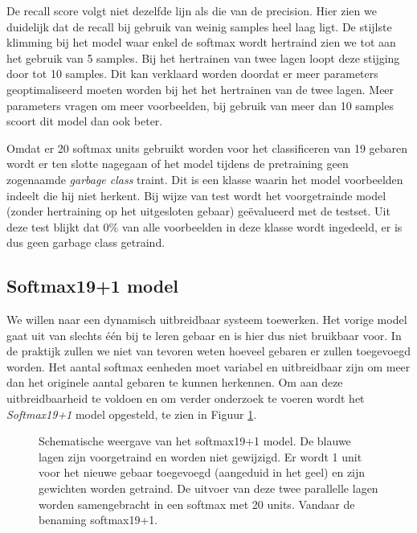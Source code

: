 \npar De recall score volgt niet dezelfde lijn als die van de precision. Hier zien we duidelijk dat de recall bij gebruik van weinig samples heel laag ligt. De stijlste klimming bij het model waar enkel de softmax wordt hertraind zien we tot aan het gebruik van 5 samples. Bij het hertrainen van twee lagen loopt deze stijging door tot 10 samples. Dit kan verklaard worden doordat er meer parameters geoptimaliseerd moeten worden bij het het hertrainen van de twee lagen. Meer parameters vragen om meer voorbeelden, bij gebruik van meer dan 10 samples scoort dit model dan  ook beter.

\npar Omdat er 20 softmax units gebruikt worden voor het classificeren van 19 gebaren wordt er ten slotte nagegaan of het model tijdens de pretraining geen zogenaamde \textit{garbage class} traint. Dit is een klasse waarin het model voorbeelden indeelt die hij niet herkent. Bij wijze van test wordt het voorgetrainde model (zonder hertraining op het uitgesloten gebaar) ge\"evalueerd met de testset. Uit deze test blijkt dat 0\% van alle voorbeelden in deze klasse wordt ingedeeld, er is dus geen garbage class getraind. 

\subsection{Softmax19+1 model}\label{sec:softmax19x1}
We willen naar een dynamisch uitbreidbaar systeem toewerken. Het vorige model gaat uit van slechts \'e\'en bij te leren gebaar en is hier dus niet bruikbaar voor. In de praktijk zullen we niet van tevoren weten hoeveel gebaren er zullen toegevoegd worden. Het aantal softmax eenheden moet variabel en uitbreidbaar zijn om meer dan het originele aantal gebaren te kunnen herkennen. Om aan deze uitbreidbaarheid te voldoen en om verder onderzoek te voeren wordt het \textit{Softmax19+1} model opgesteld, te zien in Figuur \ref{fig:19+1}.

\begin{figure}
	\centering
	\def\svgwidth{0.7\columnwidth}
	
	\caption{Schematische weergave van het softmax19+1 model. De blauwe lagen zijn voorgetraind en worden niet gewijzigd. Er wordt 1 unit voor het nieuwe gebaar toegevoegd (aangeduid in het geel) en zijn gewichten worden getraind. De uitvoer van deze twee parallelle lagen worden samengebracht in een softmax met 20 units. Vandaar de benaming softmax19+1.}\label{fig:19+1}
\end{figure}

